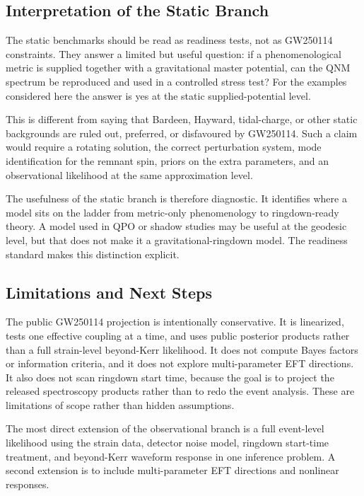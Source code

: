 \documentclass[aps,prd,10pt,twocolumn,nofootinbib,superscriptaddress]{revtex4-2}
\begin{document}
\subsection{Interpretation of the Static Branch}

The static benchmarks should be read as readiness tests, not as GW250114
constraints. They answer a limited but useful question: if a phenomenological
metric is supplied together with a gravitational master potential, can the QNM
spectrum be reproduced and used in a controlled stress test? For the examples
considered here the answer is yes at the static supplied-potential level.

This is different from saying that Bardeen, Hayward, tidal-charge, or other
static backgrounds are ruled out, preferred, or disfavoured by GW250114. Such a
claim would require a rotating solution, the correct perturbation system, mode
identification for the remnant spin, priors on the extra parameters, and an
observational likelihood at the same approximation level.

The usefulness of the static branch is therefore diagnostic. It identifies
where a model sits on the ladder from metric-only phenomenology to
ringdown-ready theory. A model used in QPO or shadow studies may be useful at
the geodesic level, but that does not make it a gravitational-ringdown model.
The readiness standard makes this distinction explicit.

\subsection{Limitations and Next Steps}

The public GW250114 projection is intentionally conservative. It is linearized,
tests one effective coupling at a time, and uses public posterior products
rather than a full strain-level beyond-Kerr likelihood. It does not compute
Bayes factors or information criteria, and it does not explore multi-parameter
EFT directions. It also does not scan ringdown start time, because the goal is
to project the released spectroscopy products rather than to redo the event
analysis. These are limitations of scope rather than hidden assumptions.

The most direct extension of the observational branch is a full event-level
likelihood using the strain data, detector noise model, ringdown start-time
treatment, and beyond-Kerr waveform response in one inference problem. A second
extension is to include multi-parameter EFT directions and nonlinear responses.
\end{document}
